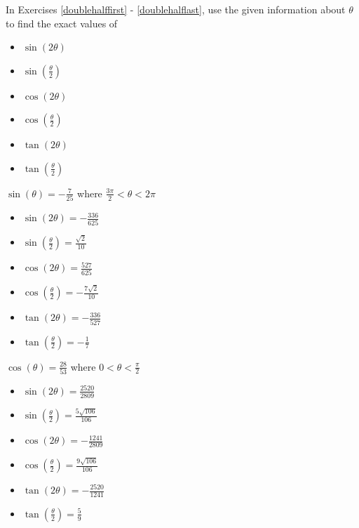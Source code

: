 \documentclass{ximera}
\begin{document}
\begin{question}
    
In Exercises \ref{doublehalffirst} - \ref{doublehalflast}, use the given information about $\theta$ to find the exact values of 

\begin{itemize}

\item $\sin(2\theta)$
\item $\sin\left(\frac{\theta}{2}\right)$
\item $\cos(2\theta)$
\item $\cos\left(\frac{\theta}{2}\right)$
\item $\tan(2\theta)$
\item $\tan\left(\frac{\theta}{2}\right)$

\end{itemize}

\begin{problem}\label{doublehalffirst}
$\sin(\theta) = -\frac{7}{25}$ where $\frac{3\pi}{2} < \theta < 2\pi$ 

\begin{solution}
\begin{itemize}

\item $\sin(2\theta) = -\frac{336}{625}$
\item $\sin\left(\frac{\theta}{2}\right) = \frac{\sqrt{2}}{10}$
\item $\cos(2\theta) = \frac{527}{625}$
\item $\cos\left(\frac{\theta}{2}\right) = -\frac{7\sqrt{2}}{10}$
\item $\tan(2\theta) = -\frac{336}{527}$
\item $\tan\left(\frac{\theta}{2}\right) = -\frac{1}{7}$

\end{itemize}
\end{solution}
\end{problem}

\begin{problem}
$\cos(\theta) = \frac{28}{53}$ where $0 < \theta < \frac{\pi}{2}$

\begin{solution}
\begin{itemize}

\item $\sin(2\theta) = \frac{2520}{2809}$
\item $\sin\left(\frac{\theta}{2}\right) = \frac{5\sqrt{106}}{106}$
\item $\cos(2\theta) = -\frac{1241}{2809}$
\item $\cos\left(\frac{\theta}{2}\right) = \frac{9\sqrt{106}}{106}$
\item $\tan(2\theta) = -\frac{2520}{1241}$
\item $\tan\left(\frac{\theta}{2}\right) = \frac{5}{9}$


\end{itemize}
\end{solution}
\end{problem}
\end{question}
\end{document}
